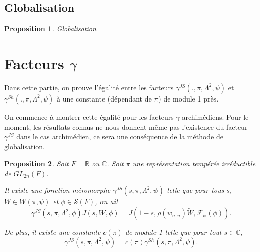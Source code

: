 \documentclass{amsart}
\newtheorem{proposition}{Proposition}[section]
\begin{document}
 \subsection{Globalisation}
 
 \begin{proposition}
 \label{globalisation}
 Globalisation
 \end{proposition}
 
 \section{Facteurs $\gamma$}
 
 Dans cette partie, on prouve l'égalité entre les facteurs $\gamma^{JS}(., \pi, \Lambda^2, \psi)$ et $\gamma^{Sh}(., \pi, \Lambda^2, \psi)$ à une constante (dépendant de $\pi$) de module 1 près.
 
 On commence à montrer cette égalité pour les facteurs $\gamma$ archimédiens. Pour le moment, les résultats connus ne nous donnent même pas l'existence du facteur $\gamma^{JS}$ dans le cas archimédien, ce sera une conséquence de la méthode de globalisation.
 
 \begin{proposition}
 Soit $F = \mathbb{R}$ ou $\mathbb{C}$. Soit $\pi$ une représentation tempérée irréductible de $GL_{2n}(F)$. 
 
 Il existe une fonction méromorphe $\gamma^{JS}(s,\pi,\Lambda^2,\psi)$ telle que pour tous $s$, $W \in W(\pi, \psi)$ et $\phi \in \mathcal{S}(F)$, on ait
 \begin{equation}
 \gamma^{JS}(s, \pi, \Lambda^2, \phi) J(s, W, \phi) = J(1-s, \rho(w_{n,n})\tilde{W}, \mathcal{F}_\psi(\phi)).
 \end{equation}
 
 De plus, il existe une constante $c(\pi)$ de module 1 telle que pour tout $s \in \mathbb{C}$,
 \begin{equation}
 \gamma^{JS}(s, \pi, \Lambda^2, \psi) = c(\pi)\gamma^{Sh}(s, \pi, \Lambda^2, \psi).
 \end{equation}
 \end{proposition}
 
\end{document}

